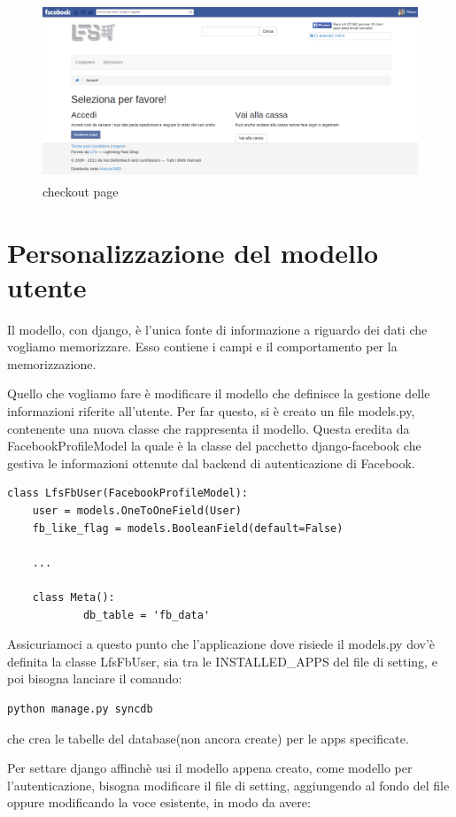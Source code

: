 \begin{figure}
\centering
\includegraphics[width=0.9\columnwidth]{img/checkout}
\caption{checkout page}
\end{figure}

\section{Personalizzazione del modello utente}\label{models}
Il modello, con django, è l'unica fonte di informazione a riguardo dei dati che vogliamo memorizzare. Esso contiene i campi e il comportamento per la memorizzazione. 

Quello che vogliamo fare è modificare il modello che definisce la gestione delle informazioni riferite all'utente. Per far questo, si è creato un file models.py, contenente una nuova classe che rappresenta il modello. Questa eredita da FacebookProfileModel la quale è la classe del pacchetto django-facebook che gestiva le informazioni ottenute dal backend di autenticazione di Facebook.

\begin{lstlisting}
class LfsFbUser(FacebookProfileModel):
    user = models.OneToOneField(User)
    fb_like_flag = models.BooleanField(default=False)
	
	...	
	
    class Meta():
            db_table = 'fb_data'            
\end{lstlisting}
Assicuriamoci a questo punto che l'applicazione dove risiede il models.py dov'è definita la classe LfsFbUser, sia tra le INSTALLED\_APPS del file di setting, e poi bisogna lanciare il comando: 
\begin{lstlisting}
python manage.py syncdb
\end{lstlisting}
che crea le tabelle del database(non ancora create) per le apps specificate.

Per settare django affinchè usi il modello appena creato, come modello per l'autenticazione, bisogna modificare il file di setting, aggiungendo al fondo del file oppure modificando la voce esistente, in modo da avere:

